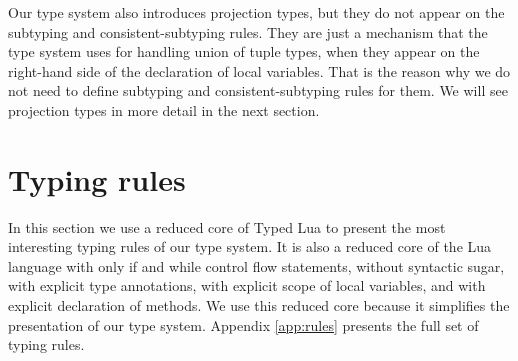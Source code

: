 Our type system also introduces projection types, but they do not
appear on the subtyping and consistent-subtyping rules.
They are just a mechanism that the type system uses for handling
union of tuple types, when they appear on the right-hand side of
the declaration of local variables.
That is the reason why we do not need to define subtyping and
consistent-subtyping rules for them.
We will see projection types in more detail in the next section.

\section{Typing rules}

In this section we use a reduced core of Typed Lua to present the
most interesting typing rules of our type system.
It is also a reduced core of the Lua language with only if and while
control flow statements, without syntactic sugar, with explicit
type annotations, with explicit scope of local variables, and
with explicit declaration of methods.
We use this reduced core because it simplifies the presentation
of our type system.
Appendix \ref{app:rules} presents the full set of typing rules.

